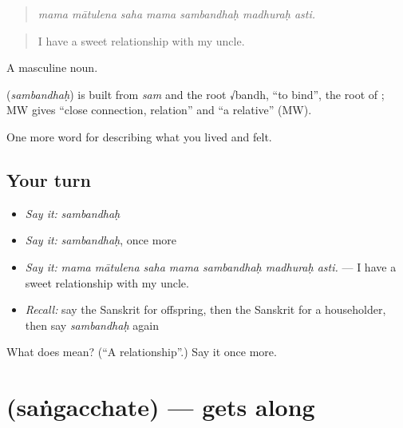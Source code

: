 \begin{quote}
      
\end{quote}

\begin{quote}
\emph{mama mātulena saha mama sambandhaḥ madhuraḥ asti.}
\end{quote}

\begin{quote}
I have a sweet relationship with my uncle.
\end{quote}

A masculine noun.

\begin{cousinweb}
\textbf{} (\emph{sambandhaḥ}) is built from \emph{sam} and the root √bandh, \textquotedblleft{}to bind\textquotedblright{}, the root of \textbf{}; MW gives \textquotedblleft{}close connection, relation\textquotedblright{} and \textquotedblleft{}a relative\textquotedblright{} (MW).
\end{cousinweb}

\begin{grammarlens}[title={What you've built}]
One more word for describing what you lived and felt.
\end{grammarlens}

\subsection*{Your turn}
\begin{itemize}
\raggedright
  \item \emph{Say it:} \emph{sambandhaḥ}
  \item \emph{Say it:} \emph{sambandhaḥ}, once more
  \item \emph{Say it:} \emph{mama mātulena saha mama sambandhaḥ madhuraḥ asti.} — I have a sweet relationship with my uncle.
  \item \emph{Recall:} say the Sanskrit for offspring, then the Sanskrit for a householder, then say \emph{sambandhaḥ} again
\end{itemize}

\begin{tcolorbox}[breakable,colback=teal!4,colframe=teal!35!black,title={Before you move on}]
What does  mean? (\textquotedblleft{}A relationship\textquotedblright{}.) Say it once more.
\end{tcolorbox}
\section[\texorpdfstring{\sk{संगच्छते} (saṅgacchate)}{संगच्छते (saṅgacchate)}]{ (saṅgacchate) — gets along}

